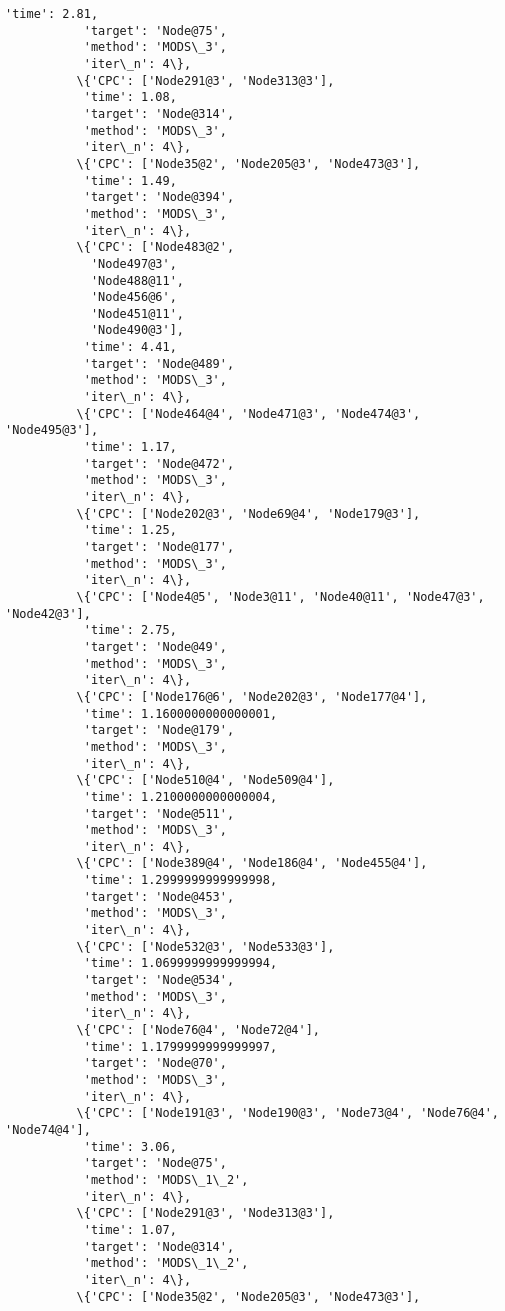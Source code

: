 \documentclass[11pt]{article}
\begin{document}
\begin{Verbatim}[commandchars=\\\{\}]
           'time': 2.81,
           'target': 'Node@75',
           'method': 'MODS\_3',
           'iter\_n': 4\},
          \{'CPC': ['Node291@3', 'Node313@3'],
           'time': 1.08,
           'target': 'Node@314',
           'method': 'MODS\_3',
           'iter\_n': 4\},
          \{'CPC': ['Node35@2', 'Node205@3', 'Node473@3'],
           'time': 1.49,
           'target': 'Node@394',
           'method': 'MODS\_3',
           'iter\_n': 4\},
          \{'CPC': ['Node483@2',
            'Node497@3',
            'Node488@11',
            'Node456@6',
            'Node451@11',
            'Node490@3'],
           'time': 4.41,
           'target': 'Node@489',
           'method': 'MODS\_3',
           'iter\_n': 4\},
          \{'CPC': ['Node464@4', 'Node471@3', 'Node474@3', 'Node495@3'],
           'time': 1.17,
           'target': 'Node@472',
           'method': 'MODS\_3',
           'iter\_n': 4\},
          \{'CPC': ['Node202@3', 'Node69@4', 'Node179@3'],
           'time': 1.25,
           'target': 'Node@177',
           'method': 'MODS\_3',
           'iter\_n': 4\},
          \{'CPC': ['Node4@5', 'Node3@11', 'Node40@11', 'Node47@3', 'Node42@3'],
           'time': 2.75,
           'target': 'Node@49',
           'method': 'MODS\_3',
           'iter\_n': 4\},
          \{'CPC': ['Node176@6', 'Node202@3', 'Node177@4'],
           'time': 1.1600000000000001,
           'target': 'Node@179',
           'method': 'MODS\_3',
           'iter\_n': 4\},
          \{'CPC': ['Node510@4', 'Node509@4'],
           'time': 1.2100000000000004,
           'target': 'Node@511',
           'method': 'MODS\_3',
           'iter\_n': 4\},
          \{'CPC': ['Node389@4', 'Node186@4', 'Node455@4'],
           'time': 1.2999999999999998,
           'target': 'Node@453',
           'method': 'MODS\_3',
           'iter\_n': 4\},
          \{'CPC': ['Node532@3', 'Node533@3'],
           'time': 1.0699999999999994,
           'target': 'Node@534',
           'method': 'MODS\_3',
           'iter\_n': 4\},
          \{'CPC': ['Node76@4', 'Node72@4'],
           'time': 1.1799999999999997,
           'target': 'Node@70',
           'method': 'MODS\_3',
           'iter\_n': 4\},
          \{'CPC': ['Node191@3', 'Node190@3', 'Node73@4', 'Node76@4', 'Node74@4'],
           'time': 3.06,
           'target': 'Node@75',
           'method': 'MODS\_1\_2',
           'iter\_n': 4\},
          \{'CPC': ['Node291@3', 'Node313@3'],
           'time': 1.07,
           'target': 'Node@314',
           'method': 'MODS\_1\_2',
           'iter\_n': 4\},
          \{'CPC': ['Node35@2', 'Node205@3', 'Node473@3'],

\end{Verbatim}
\end{document}
